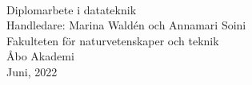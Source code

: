 \thispagestyle{empty}
\vspace*{3cm}

\begin{center}
	\begin{minipage}{0.6\textwidth}
		\centering
		{\Large\textbf{\MakeUppercase{\thetitle}}} \\
		\vspace{1em}\theauthor
	\end{minipage}
\end{center}

\vfill

\begin{flushright}
	Diplomarbete i datateknik \\
	Handledare: Marina Waldén och Annamari Soini \\
	Fakulteten för naturvetenskaper och teknik \\
	Åbo Akademi \\
	Juni, 2022
\end{flushright}

